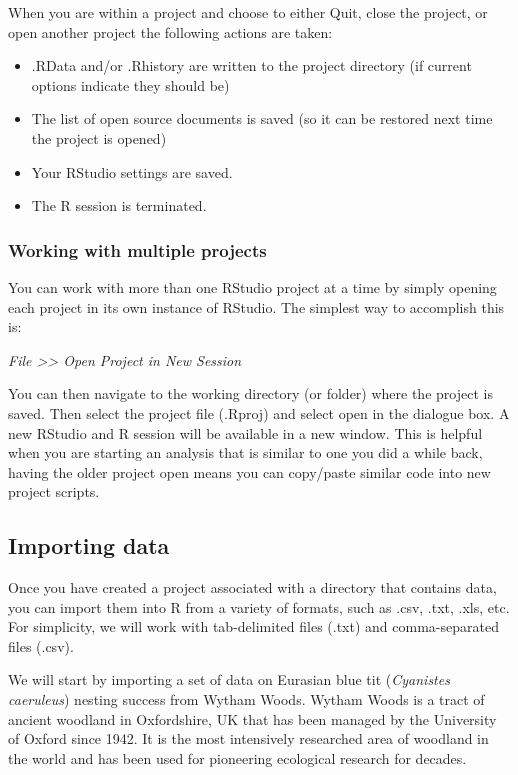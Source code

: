 \documentclass[
]{book}
\providecommand{\tightlist}{%
  \setlength{\itemsep}{0pt}\setlength{\parskip}{0pt}}
\begin{document}
When you are within a project and choose to either Quit, close the
project, or open another project the following actions are taken:

\begin{itemize}
\tightlist
\item
  .RData and/or .Rhistory are written to the project directory (if
  current options indicate they should be)
\item
  The list of open source documents is saved (so it can be restored next
  time the project is opened)
\item
  Your RStudio settings are saved.
\item
  The R session is terminated.
\end{itemize}

\hypertarget{multiproj}{%
\subsubsection{Working with multiple projects}\label{multiproj}}

You can work with more than one RStudio project at a time by simply
opening each project in its own instance of RStudio. The simplest way to
accomplish this is:

\emph{File \textgreater\textgreater{} Open Project in New Session}

You can then navigate to the working directory (or folder) where the
project is saved. Then select the project file (.Rproj) and select open
in the dialogue box. A new RStudio and R session will be available in a
new window. This is helpful when you are starting an analysis that is
similar to one you did a while back, having the older project open means
you can copy/paste similar code into new project scripts.

\hypertarget{import}{%
\subsection{Importing data}\label{import}}

Once you have created a project associated with a directory that
contains data, you can import them into R from a variety of formats,
such as .csv, .txt, .xls, etc. For simplicity, we will work with
tab-delimited files (.txt) and comma-separated files (.csv).

We will start by importing a set of data on Eurasian blue tit
(\emph{Cyanistes caeruleus}) nesting success from Wytham Woods. Wytham
Woods is a tract of ancient woodland in Oxfordshire, UK that has been
managed by the University of Oxford since 1942. It is the most
intensively researched area of woodland in the world and has been used
for pioneering ecological research for decades.
\end{document}
